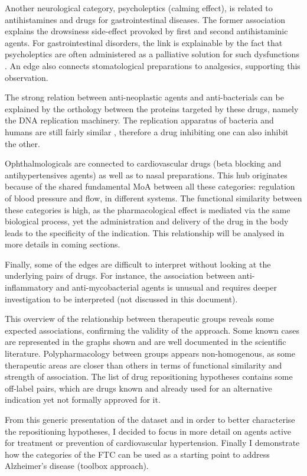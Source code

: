 Another neurological category, psycholeptics (calming effect), is related to antihistamines and drugs for gastrointestinal diseases. The former association explains the drowsiness side-effect provoked by first and second antihistaminic agents. For gastrointestinal disorders, the link is explainable by the fact that psycholeptics are often administered as a palliative solution for such dysfunctions \citep{atca03}. An edge also connects stomatological preparations to analgesics, supporting this observation.

The strong relation between anti-neoplastic agents and anti-bacterials can be explained by the orthology between the proteins targeted by these drugs, namely the DNA replication machinery. The replication apparatus of bacteria and humans are still fairly similar \citep{hurle2013computational}, therefore a drug inhibiting one can also inhibit the other.

Ophthalmologicals are connected to cardiovascular drugs (beta blocking and antihypertensives agents) as well as to nasal preparations. This hub originates because of the shared fundamental MoA between all these categories: regulation of blood pressure and flow, in different systems. The functional similarity between these categories is high, as the pharmacological effect is mediated via the same biological process, yet the administration and delivery of the drug in the body leads to the specificity of the indication. This relationship will be analysed in more details in coming sections.

Finally, some of the edges are difficult to interpret without looking at the underlying pairs of drugs. For instance, the association between anti-inflammatory and anti-mycobacterial agents is unusual and requires deeper investigation to be interpreted (not discussed in this document).

This overview of the relationship between therapeutic groups reveals some expected associations, confirming the validity of the approach. Some known cases are represented in the graphs shown and are well documented in the scientific literature. Polypharmacology between groups appears non-homogenous, as some therapeutic areas are closer than others in terms of functional similarity and strength of association. The list of drug repositioning hypotheses contains some off-label pairs, which are drugs known and already used for an alternative indication yet not formally approved for it.

From this generic presentation of the dataset and in order to better characterise the repositioning hypotheses, I decided to focus in more detail on agents active for treatment or prevention of cardiovascular hypertension. Finally I demonstrate how the categories of the FTC can be used as a starting point to address Alzheimer’s disease (toolbox approach).

